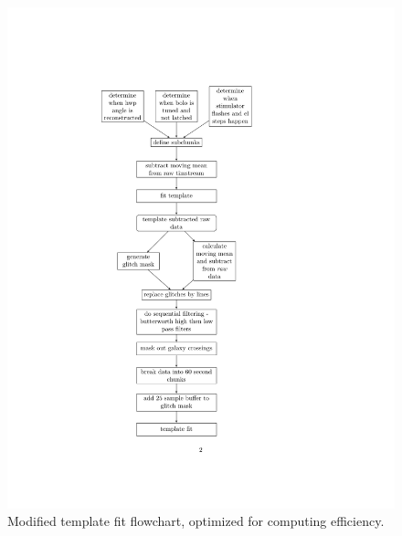 \begin{figure}[htbp]
\begin{center}
\includegraphics[width=0.6 \textwidth]{figures/mpi_new_block.pdf}
\caption{Modified template fit flowchart, optimized for computing efficiency.}
\label{fig:mpi_fit_flow}
\end{center}
\end{figure}


